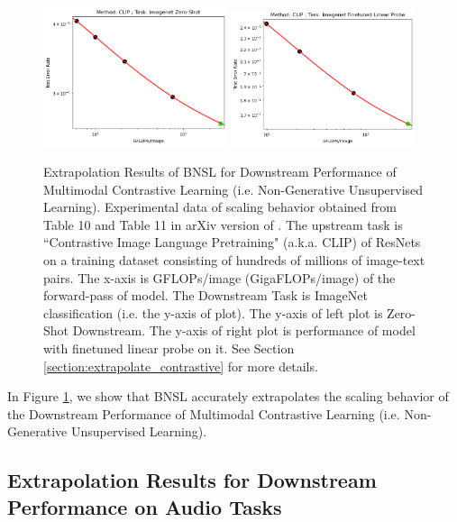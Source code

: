 \documentclass{article} %
\begin{document}
\begin{figure}[htbp]
    \centering
\includegraphics[width=0.48\textwidth]{figures/clip/CLIP__Resnet__Imagenet_Zero-Shot.png}
\includegraphics[width=0.48\textwidth]{figures/clip/CLIP__Resnet__Imagenet_Finetune_Linear_Probe.png}

    \caption{
    Extrapolation Results of BNSL for Downstream Performance of Multimodal Contrastive Learning (i.e. Non-Generative Unsupervised Learning). Experimental data of scaling behavior obtained from Table 10 and Table 11 in arXiv version of \cite{radford2021learning}. The upstream task is ``Contrastive Image Language Pretraining" (a.k.a. CLIP) of ResNets on a training dataset consisting of hundreds of millions of image-text pairs. The x-axis is GFLOPs/image (GigaFLOPs/image) of the forward-pass of model. The Downstream Task is ImageNet classification (i.e. the y-axis of plot). The y-axis of left plot is Zero-Shot Downstream. The y-axis of right plot is performance of model with finetuned linear probe on it. See Section \ref{section:extrapolate_contrastive} for more details.
    }
    \label{fig:extrapolate_audio}
\end{figure}

In Figure \ref{fig:extrapolate_audio}, we show that BNSL accurately extrapolates the scaling behavior of the Downstream Performance of Multimodal Contrastive Learning (i.e. Non-Generative Unsupervised Learning).

\subsection{Extrapolation Results for Downstream Performance on Audio Tasks}
\label{section:extrapolate_audio}
\end{document}

